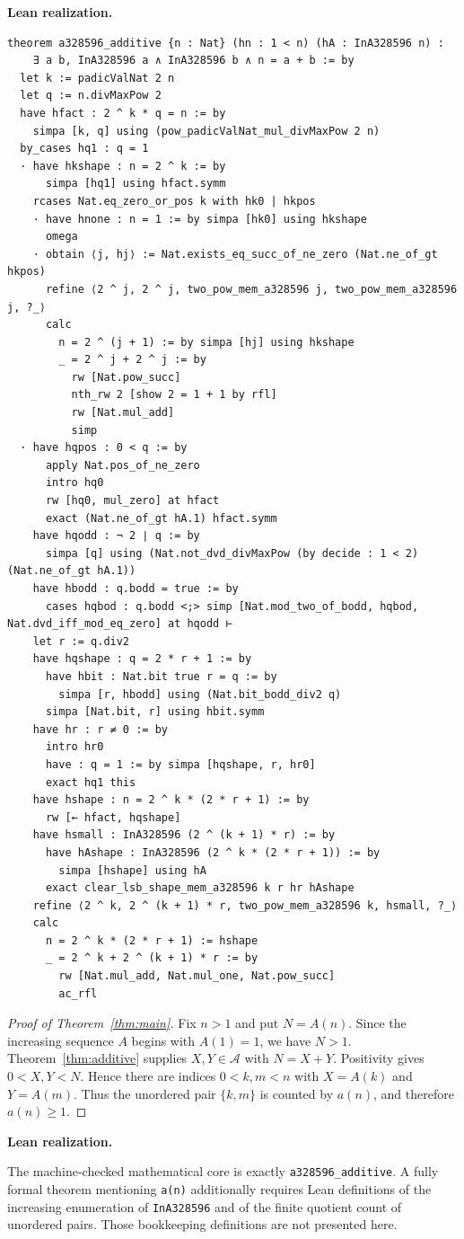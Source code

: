 \documentclass[11pt]{article}
\theoremstyle{definition}
\theoremstyle{remark}
\newenvironment{leanbridge}{%
  \par\smallskip\noindent\textbf{Lean realization.}\par\smallskip%
}{%
  \par\smallskip%
}
\newcommand{\SeqA}{\mathcal{A}}
\begin{document}
\begin{leanbridge}
\begin{lstlisting}
theorem a328596_additive {n : Nat} (hn : 1 < n) (hA : InA328596 n) :
    ∃ a b, InA328596 a ∧ InA328596 b ∧ n = a + b := by
  let k := padicValNat 2 n
  let q := n.divMaxPow 2
  have hfact : 2 ^ k * q = n := by
    simpa [k, q] using (pow_padicValNat_mul_divMaxPow 2 n)
  by_cases hq1 : q = 1
  · have hkshape : n = 2 ^ k := by
      simpa [hq1] using hfact.symm
    rcases Nat.eq_zero_or_pos k with hk0 | hkpos
    · have hnone : n = 1 := by simpa [hk0] using hkshape
      omega
    · obtain ⟨j, hj⟩ := Nat.exists_eq_succ_of_ne_zero (Nat.ne_of_gt hkpos)
      refine ⟨2 ^ j, 2 ^ j, two_pow_mem_a328596 j, two_pow_mem_a328596 j, ?_⟩
      calc
        n = 2 ^ (j + 1) := by simpa [hj] using hkshape
        _ = 2 ^ j + 2 ^ j := by
          rw [Nat.pow_succ]
          nth_rw 2 [show 2 = 1 + 1 by rfl]
          rw [Nat.mul_add]
          simp
  · have hqpos : 0 < q := by
      apply Nat.pos_of_ne_zero
      intro hq0
      rw [hq0, mul_zero] at hfact
      exact (Nat.ne_of_gt hA.1) hfact.symm
    have hqodd : ¬ 2 ∣ q := by
      simpa [q] using (Nat.not_dvd_divMaxPow (by decide : 1 < 2) (Nat.ne_of_gt hA.1))
    have hbodd : q.bodd = true := by
      cases hqbod : q.bodd <;> simp [Nat.mod_two_of_bodd, hqbod, Nat.dvd_iff_mod_eq_zero] at hqodd ⊢
    let r := q.div2
    have hqshape : q = 2 * r + 1 := by
      have hbit : Nat.bit true r = q := by
        simpa [r, hbodd] using (Nat.bit_bodd_div2 q)
      simpa [Nat.bit, r] using hbit.symm
    have hr : r ≠ 0 := by
      intro hr0
      have : q = 1 := by simpa [hqshape, r, hr0]
      exact hq1 this
    have hshape : n = 2 ^ k * (2 * r + 1) := by
      rw [← hfact, hqshape]
    have hsmall : InA328596 (2 ^ (k + 1) * r) := by
      have hAshape : InA328596 (2 ^ k * (2 * r + 1)) := by
        simpa [hshape] using hA
      exact clear_lsb_shape_mem_a328596 k r hr hAshape
    refine ⟨2 ^ k, 2 ^ (k + 1) * r, two_pow_mem_a328596 k, hsmall, ?_⟩
    calc
      n = 2 ^ k * (2 * r + 1) := hshape
      _ = 2 ^ k + 2 ^ (k + 1) * r := by
        rw [Nat.mul_add, Nat.mul_one, Nat.pow_succ]
        ac_rfl
\end{lstlisting}
\end{leanbridge}

\begin{proof}[Proof of Theorem~\ref{thm:main}]
Fix $n>1$ and put $N=A(n)$.  Since the increasing sequence $A$ begins with
$A(1)=1$, we have $N>1$.  Theorem~\ref{thm:additive} supplies
$X,Y\in\SeqA$ with $N=X+Y$.  Positivity gives $0<X,Y<N$.  Hence there are
indices $0<k,m<n$ with $X=A(k)$ and $Y=A(m)$.  Thus the unordered pair
$\{k,m\}$ is counted by $a(n)$, and therefore $a(n)\geq1$.
\end{proof}
\begin{leanbridge}
The machine-checked mathematical core is exactly
\texttt{a328596\_additive}.  A fully formal theorem mentioning
\texttt{a(n)} additionally requires Lean definitions of the increasing
enumeration of \texttt{InA328596} and of the finite quotient count of
unordered pairs.  Those bookkeeping definitions are not presented here.
\end{leanbridge}
\end{document}
